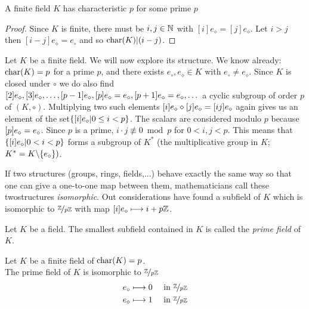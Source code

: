 \begin{lemma}
A finite field $K$ has characteristic $p$ for some prime $p$
\begin{proof}
Since $K$ is finite, there must be $i,j \in \mathbb{N}$ with $[i]e_{\diamond} = [j]e_{\diamond}$. Let $i > j$ then $[i-j]e_{\diamond} = e_{\circ}$ and so $\operatorname{char}(K)|(i-j)$.
\end{proof}
\end{lemma}

Let $K$ be a finite field. We will now explore its structure. We know already: $\operatorname{char}(K) = p$ for a prime $p$, and there exists $e_{\circ}, e_{\diamond} \in K$ with $e_{\circ} \neq e_{\diamond}$. Since $K$ is closed under $\circ$ we do also find $[2]e_{\diamond}, [3]e_{\diamond},\dots,[p-1]e_{\diamond},[p]e_{\diamond} = e_{\circ}, [p+1]e_{\diamond} = e_{\diamond}, \dots$ a cyclic subgroup of order $p$ of $(K,\circ)$. Multiplying two such elements $[i]e_{\diamond} \diamond [j]e_{\diamond} = [ij]e_{\diamond}$ again gives us an element of the set$\{[i]e_{\diamond} | 0 \leq i < p\}$. The scalars are considered modulo $p$ because $[p]e_{\diamond} = e_{\circ}$. Since $p$ is a prime, $i \cdot j \not \equiv 0 \bmod p$ for $0 < i,j < p$. This means that  $\{[i]e_{\diamond} | 0<i<p\}$ forms a subgroup of $K^{\ast}$ (the multiplicative group in $K$; $K^{\ast} = K \backslash \{e_{\circ}\})$.

\begin{figure}[H]
  \label{fig:ring_structure}
\end{figure}

If two structures (groups, rings, fields,...) behave exactly the same way so that one can give a one-to-one map between them, mathematicians call these twostructures \emph{isomorphic}. Out considerations have found a subfield of $K$ which is isomorphic to $\nicefrac{\mathbb{Z}}{p \mathbb{Z}}$ with map $[i]e_{\diamond} \longmapsto i + p \mathbb{Z}$.

\begin{definition}
Let $K$ be a field. The smallest subfield contained in $K$ is called the \emph{prime field} of $K$.
\end{definition}

\begin{lemma}
Let $K$ be a finite field of $\operatorname{char}(K) = p$.\\
The prime field of $K$ is isomorphic to $\nicefrac{\mathbb{Z}}{p \mathbb{Z}}$
\begin{align*}
e_{\circ} &\longmapsto 0 & \text{ in } \nicefrac{\mathbb{Z}}{p \mathbb{Z}} \\
e_{\diamond} &\longmapsto 1 & \text{ in } \nicefrac{\mathbb{Z}}{p \mathbb{Z}}
\end{align*}
\end{lemma}

